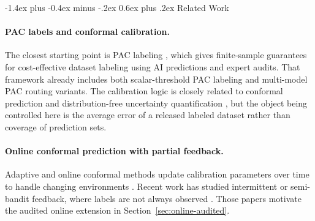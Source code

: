 \documentclass[11pt]{article}
\makeatletter
\renewcommand\section{\@startsection{section}{1}{\z@}%
  {-1.4ex plus -0.4ex minus -.2ex}%
  {0.6ex plus .2ex}%
  {\normalfont\Large\bfseries}}
\makeatother
\begin{document}






\appendix

\section{Related Work}
\label{app:related-work}

\paragraph{PAC labels and conformal calibration.}
The closest starting point is PAC labeling
\cite{candes2025paclabels}, which gives finite-sample guarantees for
cost-effective dataset labeling using AI predictions and expert audits.
That framework already includes both scalar-threshold PAC labeling and
multi-model PAC routing variants.
The calibration logic is closely related to conformal prediction and
distribution-free uncertainty quantification
\cite{vovk2005,angelopoulos2021gentle}, but the object being controlled here is
the average error of a released labeled dataset rather than coverage of
prediction sets.

\paragraph{Online conformal prediction with partial feedback.}
Adaptive and online conformal methods update calibration parameters over time
to handle changing environments \cite{gibbs2021adaptive}.
Recent work has studied intermittent or semi-bandit feedback, where labels are
not always observed \cite{ge2024stochastic,wang2025mirror,yang2026adversarial}.
Those papers motivate the audited online extension in
Section~\ref{sec:online-audited}.
\end{document}
